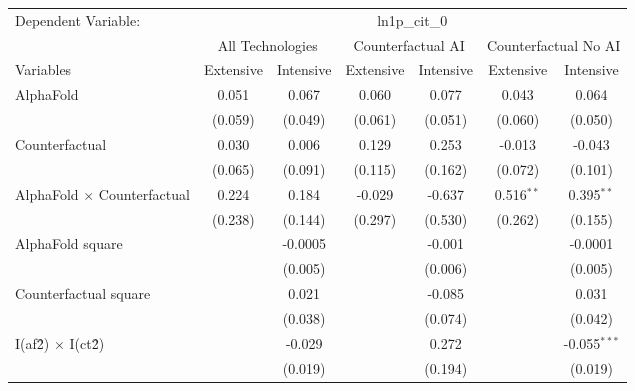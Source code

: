 \begingroup
\centering
\begin{tabular}{lcccccc}
   \tabularnewline \midrule \midrule
   Dependent Variable: & \multicolumn{6}{c}{ln1p\_cit\_0}\\
 & \multicolumn{2}{c}{All Technologies} & \multicolumn{2}{c}{Counterfactual AI} & \multicolumn{2}{c}{Counterfactual No AI} \\
\cmidrule(lr){1-1}\cmidrule(lr){2-3} \cmidrule(lr){4-5} \cmidrule(lr){6-7}
Variables & \multicolumn{1}{c}{Extensive} & \multicolumn{1}{c}{Intensive} & \multicolumn{1}{c}{Extensive} & \multicolumn{1}{c}{Intensive} & \multicolumn{1}{c}{Extensive} & \multicolumn{1}{c}{Intensive} \\
\cmidrule(lr){1-1}\cmidrule(lr){2-2} \cmidrule(lr){3-3} \cmidrule(lr){4-4} \cmidrule(lr){5-5} \cmidrule(lr){6-6} \cmidrule(lr){7-7}
   AlphaFold                          & 0.051   & 0.067   & 0.060   & 0.077   & 0.043        & 0.064\\   
                                      & (0.059) & (0.049) & (0.061) & (0.051) & (0.060)      & (0.050)\\   
   Counterfactual                     & 0.030   & 0.006   & 0.129   & 0.253   & -0.013       & -0.043\\   
                                      & (0.065) & (0.091) & (0.115) & (0.162) & (0.072)      & (0.101)\\   
   AlphaFold $\times$ Counterfactual  & 0.224   & 0.184   & -0.029  & -0.637  & 0.516$^{**}$ & 0.395$^{**}$\\   
                                      & (0.238) & (0.144) & (0.297) & (0.530) & (0.262)      & (0.155)\\   
   AlphaFold square                   &         & -0.0005 &         & -0.001  &              & -0.0001\\   
                                      &         & (0.005) &         & (0.006) &              & (0.005)\\   
   Counterfactual square              &         & 0.021   &         & -0.085  &              & 0.031\\   
                                      &         & (0.038) &         & (0.074) &              & (0.042)\\   
   I(af\^2) $\times$ I(ct\^2)         &         & -0.029  &         & 0.272   &              & -0.055$^{***}$\\   
                                      &         & (0.019) &         & (0.194) &              & (0.019)\\   

\end{tabular}
